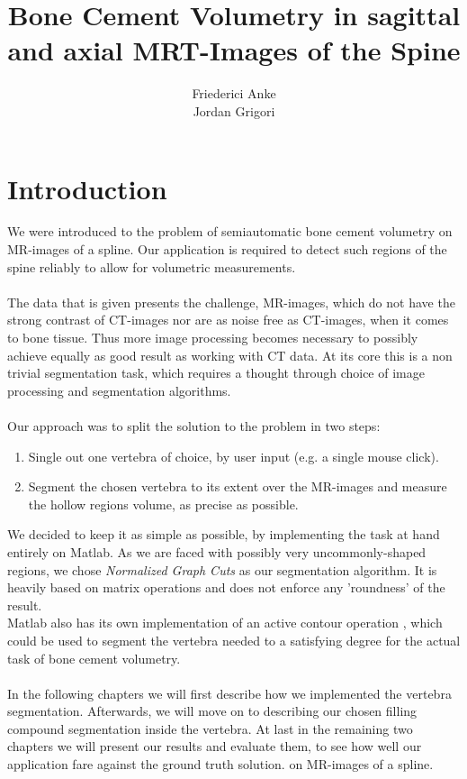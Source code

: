 \documentclass{article}
\title{Bone Cement Volumetry in sagittal and axial MRT-Images of the Spine}
\author{Friederici Anke\\ Jordan Grigori}
\begin{document}
  
  \begin{titlepage}
    \centering
    
  \end{titlepage}
  
  \maketitle
  \thispagestyle{empty}
  
  \section{Introduction}
  \setcounter{page}{1}
  {
    We were introduced to the problem of semiautomatic bone cement volumetry 
    on MR-images of a spline.
    Our application is required 
    to detect such regions of the spine reliably to allow for volumetric measurements.\\
    \\The data that is given presents the challenge, MR-images, which do not have
    the strong contrast of CT-images nor are as noise free as CT-images, when it
    comes to bone tissue. Thus more image processing becomes necessary to possibly 
    achieve equally as good result as working with CT data.
    At its core this is a non trivial segmentation task, which requires a thought 
    through choice of image processing and segmentation algorithms.\\
    \\Our approach was to split the solution to the problem in two steps:
    \begin{enumerate}
      \item Single out one vertebra of choice, by user input (e.g. a single mouse click).
      \item Segment the chosen vertebra to its extent over the MR-images and measure the hollow regions volume, as precise as possible.
    \end{enumerate}
    We decided to keep it as simple as possible, by implementing the task at hand 
    entirely on Matlab. 
    As we are faced with possibly very uncommonly-shaped regions, we chose \textit{Normalized Graph Cuts} \cite{[ShiMalik00]} as our segmentation algorithm.
    It is heavily based on matrix operations and does not enforce any 'roundness' of the result.
    \\Matlab also has its own implementation of an active contour
    operation \cite{[ChanVese01]}, which could be used to segment the vertebra needed to a satisfying degree for the actual task of bone cement volumetry.\\	
    \\In the following chapters we will first describe how we implemented the vertebra segmentation.
    Afterwards, we will move on to describing our chosen filling compound segmentation inside the vertebra.
    At last in the remaining two chapters we will present our results and evaluate them, to see how well our application fare against the ground truth solution.
    on MR-images of a spline.
  }
\end{document}

